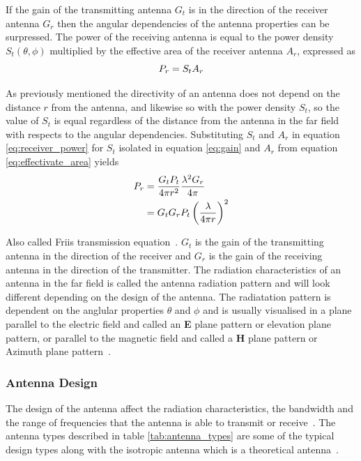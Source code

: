 If the gain of the transmitting antenna $G_t$ is in the direction of the receiver antenna $G_r$ then the angular dependencies of the antenna properties can be surpressed. The power of the receiving antenna is equal to the power density $S_t \left(\theta, \phi\right)$ multiplied by the effective area of the receiver antenna $A_r$, expressed as
\begin{equation} \label{eq:receiver_power}
    P_r = S_t A_r
    \tagaddtext{[\si{\watt}]}
\end{equation} 

As previously mentioned the directivity of an antenna does not depend on the distance $r$ from the antenna, and likewise so with the power density $S_t$, so the value of $S_t$ is equal regardless of the distance from the antenna in the far field with respects to the angular dependencies. Substituting $S_t$ and $A_r$ in equation \ref{eq:receiver_power} for $S_t$ isolated in equation \ref{eq:gain} and $A_r$ from equation \ref{eq:effectivate_area} yields
\begin{equation} \label{eq:friis}
    \begin{split}
        P_r & = \frac{G_t P_t}{4 \pi r^2} \frac{\lambda^2 G_r}{4 \pi} \\
        & = G_t  G_r P_t \left( \frac{\lambda}{4 \pi r} \right)^2
        \tagaddtext{[\si{\watt}]}
    \end{split}
\end{equation} 

Also called Friis transmission equation~\cite[pp. 1.10-1.11]{ant_eng_hk}. $G_t$ is the gain of the transmitting antenna in the direction of the receiver and $G_r$ is the gain of the receiving antenna in the direction of the transmitter. The radiation characteristics of an antenna in the far field is called the antenna radiation pattern and will look different depending on the design of the antenna. The radiatation pattern is dependent on the anglular properties $\theta$ and $\phi$ and is usually visualised in a plane parallel to the electric field and called an \textbf{E} plane pattern or elevation plane pattern, or parallel to the magnetic field and called a \textbf{H} plane pattern or Azimuth plane pattern~\cite[p. 79-80]{direct_energy}\cite[p. 13-14]{ant_beam_form}.

\subsubsection{Antenna Design}
The design of the antenna affect the radiation characteristics, the bandwidth and the range of frequencies that the antenna is able to transmit or receive~\cite[p. 76]{direct_energy}. The antenna types described in table \ref{tab:antenna_types} are some of the typical design types along with the isotropic antenna which is a theoretical antenna~\cite[p. 11]{ant_beam_form}. 

